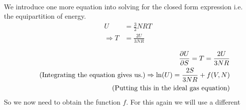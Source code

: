 \documentclass[a4paper]{article}
\begin{document}
    \\[5]
    We introduce one more equation into solving for the closed form expression i.e. the 
    equipartition of energy.
    \begin{align*}
        U &= \frac{3}{2} NRT \\ 
        \Rightarrow T & = \frac{2U}{3NR}\\ 
    \end{align*}
    \begin{align*}
        \pdv{U}{S} = T = \frac{2U}{3NR}\\ 
        \tag{Integrating the equation gives us.}
        \Rightarrow \ln (U) = \frac{2S}{3NR}+ f(V,N) \\ 
        \tag{Putting this in the ideal gas equation}
    \end{align*}
    So we now need to obtain the function \(f\). For this again we will use a different    
\end{document}
